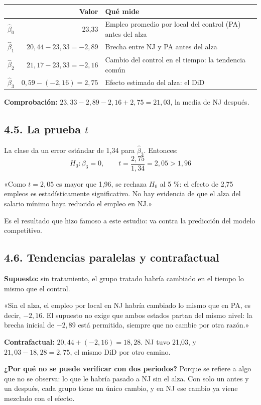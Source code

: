 \documentclass[11pt,letterpaper]{article}
\newcommand{\tema}[1]{\subsection*{#1}}
\begin{document}
\begin{center}
\begin{tabular}{lrl}
\toprule
& \textbf{Valor} & \textbf{Qué mide} \\
\midrule
$\hat\beta_0$ & 23,33 & Empleo promedio por local del control (PA) antes del alza \\
$\hat\beta_1$ & $20{,}44-23{,}33=-2{,}89$ & Brecha entre NJ y PA antes del alza \\
$\hat\beta_2$ & $21{,}17-23{,}33=-2{,}16$ & Cambio del control en el tiempo: la tendencia común \\
$\hat\beta_3$ & $0{,}59-(-2{,}16)=2{,}75$ & Efecto estimado del alza: el DiD \\
\bottomrule
\end{tabular}
\end{center}

\textbf{Comprobación:} $23{,}33-2{,}89-2{,}16+2{,}75=21{,}03$, la media de NJ después.

\tema{4.5. La prueba $t$}

La clase da un error estándar de 1,34 para $\hat\beta_3$. Entonces:
\[
H_0:\beta_3=0,\qquad t=\frac{2{,}75}{1{,}34}=2{,}05>1{,}96
\]

\begin{frase}
«Como $t=2{,}05$ es mayor que 1,96, se rechaza $H_0$ al 5 \%: el efecto de 2,75 empleos es estadísticamente significativo. No hay evidencia de que el alza del salario mínimo haya reducido el empleo en NJ.»
\end{frase}

Es el resultado que hizo famoso a este estudio: va contra la predicción del modelo competitivo.

\tema{4.6. Tendencias paralelas y contrafactual}

\textbf{Supuesto:} sin tratamiento, el grupo tratado habría cambiado en el tiempo lo mismo que el control.

\begin{frase}
«Sin el alza, el empleo por local en NJ habría cambiado lo mismo que en PA, es decir, $-2{,}16$. El supuesto no exige que ambos estados partan del mismo nivel: la brecha inicial de $-2{,}89$ está permitida, siempre que no cambie por otra razón.»
\end{frase}

\textbf{Contrafactual:} $20{,}44+(-2{,}16)=18{,}28$. NJ tuvo 21,03, y $21{,}03-18{,}28=2{,}75$, el mismo DiD por otro camino.

\textbf{¿Por qué no se puede verificar con dos periodos?} Porque se refiere a algo que no se observa: lo que le habría pasado a NJ sin el alza. Con solo un antes y un después, cada grupo tiene un único cambio, y en NJ ese cambio ya viene mezclado con el efecto.
\end{document}
